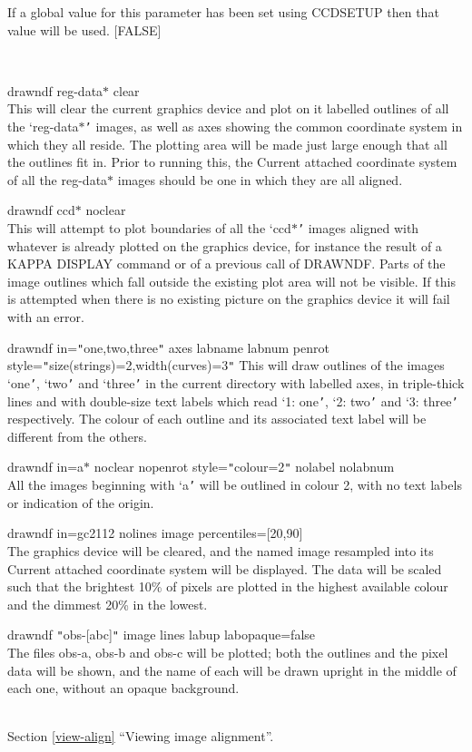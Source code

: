 \documentclass[twoside,11pt]{article}
\newcommand{\htmlref}[2]{#1}
\newcommand{\latexhtml}[2]{#1}
\newcommand{\xref}[3]{#1}
\renewcommand{\_}{\texttt{\symbol{95}}}
\newcommand{\routine}[1]{{\sc #1}}
\newcommand{\xroutine}[1]{\htmlref{{\sc #1}}{#1}}
\newcommand{\secref}[2]{\latexhtml{Section \ref{#1} ``#2''}{``\htmlref{#2}{#1}''}}
\newcommand{\sstexamples}[1]{
   \item[Examples:] \mbox{} \\
   \vspace{-3.5ex}
   \begin{description}
      #1
   \end{description}
}
\newcommand{\sstexamplesubsection}[2]{\sloppy \item{\ssttt #1} \mbox{} \\ #2 }
\newcommand{\sstnotes}[1]{\item[Notes:] \mbox{} \\[1.3ex] #1}
\newcommand{\sstdiytopic}[2]{\item[#1:] \mbox{} \\[1.3ex] #2}
\newcommand{\sstitemlist}[1]{
  \mbox{} \\
  \vspace{-3.5ex}
  \begin{itemize}
     #1
  \end{itemize}
}
\newcommand{\sstexamples}[1]{
      \item[Examples:] \\
      \begin{description}
         #1
      \end{description}
      \\
   }
\newcommand{\sstexamplesubsection}[2]{\item[{\ssttt #1}] #2}
\newcommand{\sstnotes}[1]{\item[Notes:] #1 }
\newcommand{\sstdiytopic}[2]{\item[{#1:}] #2 }
\newcommand{\sstitemlist}[1]{
      \begin{itemize}
         #1
      \end{itemize}
      \\
   }
\begin{document}
{{{         If a global value for this parameter has been set using
         \xroutine{CCDSETUP} then that value will be used.
         [FALSE]
      }
   }
   \sstexamples{
      \sstexamplesubsection{
         drawndf reg-data$*$ clear
      }{
         This will clear the current graphics device and plot on it
         labelled outlines of all the `reg-data$*${\tt '} images, as well as
         axes showing the common coordinate system in which they
         all reside.  The plotting area will be made just large enough
         that all the outlines fit in.  Prior to running this, the
         Current attached coordinate system of all the reg-data$*$ images
         should be one in which they are all aligned.
      }
      \sstexamplesubsection{
         drawndf ccd$*$ noclear
      }{
         This will attempt to plot boundaries of all the `ccd$*${\tt '} images
         aligned with whatever is already plotted on the graphics
         device, for instance the result of a KAPPA \xref{DISPLAY}{sun95}{DISPLAY} command
         or of a previous call of \routine{DRAWNDF}.  Parts of the image outlines
         which fall outside the existing plot area will not be visible.
         If this is attempted when there is no existing picture on
         the graphics device it will fail with an error.
      }
      \sstexamplesubsection{
         drawndf in={\tt "}one,two,three{\tt "} axes labname labnum penrot
      }{
              style={\tt "}size(strings)=2,width(curves)=3{\tt "}
         This will draw outlines of the images `one{\tt '}, `two{\tt '} and `three{\tt '}
         in the current directory with labelled axes, in triple-thick
         lines and with double-size text labels which read `1: one{\tt '},
         `2: two{\tt '} and `3: three{\tt '} respectively.  The colour of each
         outline and its associated text label will be different from
         the others.
      }
      \sstexamplesubsection{
         drawndf in=a$*$ noclear nopenrot style={\tt "}colour=2{\tt "} nolabel nolabnum
      }{
         All the images beginning with `a{\tt '} will be outlined in colour 2,
         with no text labels or indication of the origin.
      }
      \sstexamplesubsection{
         drawndf in=gc2112 nolines image percentiles=[20,90]
      }{
         The graphics device will be cleared, and the named image
         resampled into its Current attached coordinate system will
         be displayed.  The data will be scaled such that the brightest
         10\% of pixels are plotted in the highest available colour and
         the dimmest 20\% in the lowest.
      }
      \sstexamplesubsection{
         drawndf {\tt "}obs-[abc]{\tt "} image lines labup labopaque=false
      }{
         The files obs-a, obs-b and obs-c will be plotted; both the
         outlines and the pixel data will be shown, and the name of
         each will be drawn upright in the middle of each one,
         without an opaque background.
      }
   }
   \sstdiytopic{
      See also
   } {
      \secref{view-align}{Viewing image alignment}.
   }
   \sstnotes{
      \sstitemlist{

}}}
\end{document}
